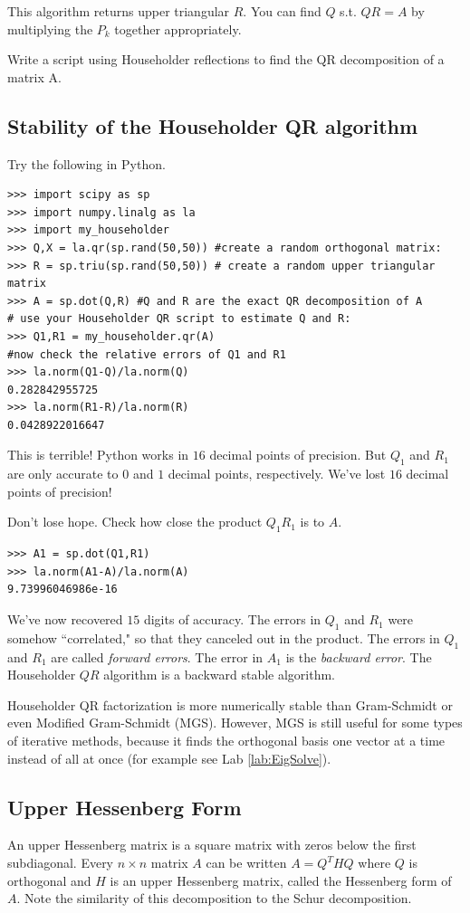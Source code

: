 This algorithm returns upper triangular $R$. You can find $Q$ s.t. $QR = A$ by multiplying the $P_k$ together appropriately.

\begin{problem}
\label{prob:HouseholderQR}
Write a script using Householder reflections to find the QR decomposition of a matrix A.
\end{problem}

\subsection*{Stability of the Householder QR algorithm}

Try the following in Python.

\begin{lstlisting}
>>> import scipy as sp
>>> import numpy.linalg as la
>>> import my_householder
>>> Q,X = la.qr(sp.rand(50,50)) #create a random orthogonal matrix:
>>> R = sp.triu(sp.rand(50,50)) # create a random upper triangular matrix
>>> A = sp.dot(Q,R) #Q and R are the exact QR decomposition of A
# use your Householder QR script to estimate Q and R:
>>> Q1,R1 = my_householder.qr(A)
#now check the relative errors of Q1 and R1
>>> la.norm(Q1-Q)/la.norm(Q)
0.282842955725
>>> la.norm(R1-R)/la.norm(R)
0.0428922016647
\end{lstlisting}
This is terrible! 
Python works in $16$ decimal points of precision. 
But $Q_1$ and $R_1$ are only accurate to $0$ and $1$ decimal points, respectively. 
We've lost $16$ decimal points of precision!

Don't lose hope. Check how close the product $Q_1 R_1$ is to $A$.
\begin{lstlisting}
>>> A1 = sp.dot(Q1,R1)
>>> la.norm(A1-A)/la.norm(A)
9.73996046986e-16
\end{lstlisting}
We've now recovered $15$ digits of accuracy. 
The errors in $Q_1$ and $R_1$ were somehow ``correlated," so that they canceled out in the product. 
The errors in $Q_1$ and $R_1$ are called \emph{forward errors}. 
The error in $A_1$ is the \emph{backward error}. 
The Householder $QR$ algorithm is a backward stable algorithm.

Householder QR factorization is more numerically stable than Gram-Schmidt or even Modified Gram-Schmidt (MGS). 
However, MGS is still useful for some types of iterative methods, because it finds the orthogonal basis one 
vector at a time instead of all at once (for example see Lab \ref{lab:EigSolve}).

\subsection*{Upper Hessenberg Form}
An upper Hessenberg matrix is a square matrix with zeros below the first subdiagonal. 
Every  $n \times n$ matrix $A$ can be written $A = Q^THQ$ where $Q$ is orthogonal and $H$ is an upper Hessenberg matrix, 
called the Hessenberg form of $A$. 
Note the similarity of this decomposition to the Schur decomposition.

